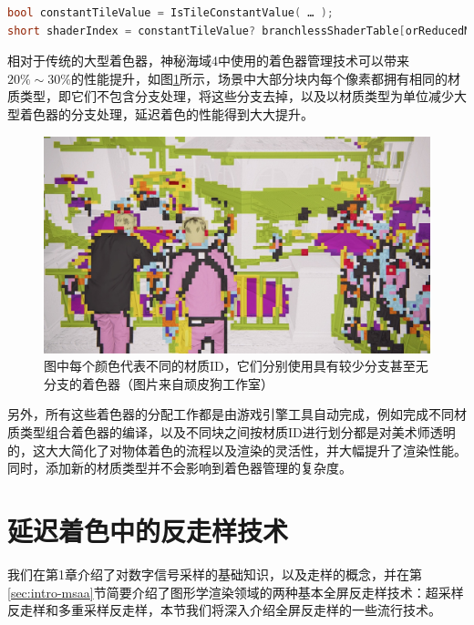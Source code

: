 \begin{lstlisting}[language=C++]
bool constantTileValue = IsTileConstantValue( … );
short shaderIndex = constantTileValue? branchlessShaderTable[orReducedMaskBits]: shaderTable[orReducedMaskBits];
\end{lstlisting}

相对于传统的大型着色器，神秘海域4中使用的着色器管理技术可以带来$20\%\sim 30\%$的性能提升，如图\ref{f:shade-material-ID}所示，场景中大部分块内每个像素都拥有相同的材质类型，即它们不包含分支处理，将这些分支去掉，以及以材质类型为单位减少大型着色器的分支处理，延迟着色的性能得到大大提升。

\begin{figure}
	\includegraphics[width=1.0\textwidth]{figures/shade/material-ID}
	\caption{图中每个颜色代表不同的材质ID，它们分别使用具有较少分支甚至无分支的着色器（图片来自顽皮狗工作室）}
	\label{f:shade-material-ID}
\end{figure}

另外，所有这些着色器的分配工作都是由游戏引擎工具自动完成，例如完成不同材质类型组合着色器的编译，以及不同块之间按材质ID进行划分都是对美术师透明的，这大大简化了对物体着色的流程以及渲染的灵活性，并大幅提升了渲染性能。同时，添加新的材质类型并不会影响到着色器管理的复杂度。





\section{延迟着色中的反走样技术}\label{sec:shade-anti-aliasing}
我们在第1章介绍了对数字信号采样的基础知识，以及走样的概念，并在第\ref{sec:intro-msaa}节简要介绍了图形学渲染领域的两种基本全屏反走样技术：超采样反走样和多重采样反走样，本节我们将深入介绍全屏反走样的一些流行技术。

